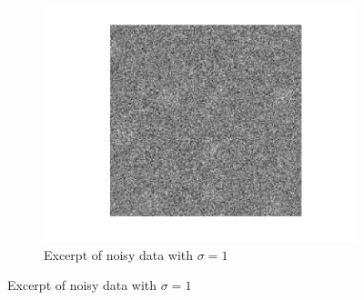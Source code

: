 \documentclass[english]{article}
\numberwithin{equation}{section}
\theoremstyle{plain}
\theoremstyle{definition}
\theoremstyle{remark}
\theoremstyle{plain}
\theoremstyle{remark}
\theoremstyle{plain}
\theoremstyle{plain}
\begin{document}
\begin{figure}[ht!]
\begin{subfigure}{.5\textwidth}
	\centering
\includegraphics[scale=0.5]{data2D_noisy_1}
\caption{Excerpt of noisy data with $\sigma=1$}
\label{fig:data2D_noisy_1}
\end{subfigure}


\end{figure}
\end{document}
